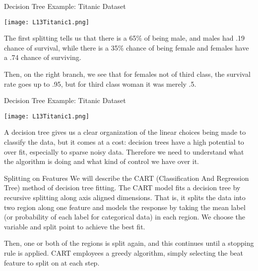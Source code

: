 \documentclass[10pt, table, dvipsnames,xcdraw]{beamer}
\begin{document}
\begin{frame}[fragile]{Decision Tree Example: Titanic Dataset}
  \begin{minipage}[t][0.6\textheight][t]{\textwidth}
	\centering \texttt{[image: L13Titanic1.png]} 
  \end{minipage}
  \vfill
\begin{minipage}[t][0.4\textheight][t]{\textwidth}
The first splitting tells us that there is a 65\% of being male, and males had .19 chance of survival, while there is a 35\% chance of being female and females have a .74 chance of surviving. \pause

Then, on the right branch, we see that for females not of third class, the survival rate goes up to .95, but for third class woman it was merely .5.
\end{minipage}
\end{frame}


\begin{frame}[fragile]{Decision Tree Example: Titanic Dataset}
  \begin{minipage}[t][0.6\textheight][t]{\textwidth}
	\centering \texttt{[image: L13Titanic1.png]} 
  \end{minipage}
  \vfill
\begin{minipage}[t][0.4\textheight][t]{\textwidth}
A decision tree gives us a clear organization of the linear choices being made to classify the data, but it comes at a cost: decision trees have a high potential to over fit, especially to sparse noisy data. Therefore we need to understand what the algorithm is doing and what kind of control we have over it. 
\end{minipage}
\end{frame}



\begin{frame}[fragile]{Splitting on Features}
We will describe the CART (Classification And Regression Tree) method of decision tree fitting. The CART model fits a decision tree by recursive splitting along axis aligned dimensions. That is, it splits the data into two region along one feature and models the response by taking the mean label (or probability of each label for categorical data) in each region. \pause We choose the variable and split point to achieve the best fit. \pause\newline

Then, one or both of the regions is split again, and this continues until a stopping rule is applied. CART employees a greedy algorithm, simply selecting the beat feature to split on at each step. 
\end{frame}
\end{document}
